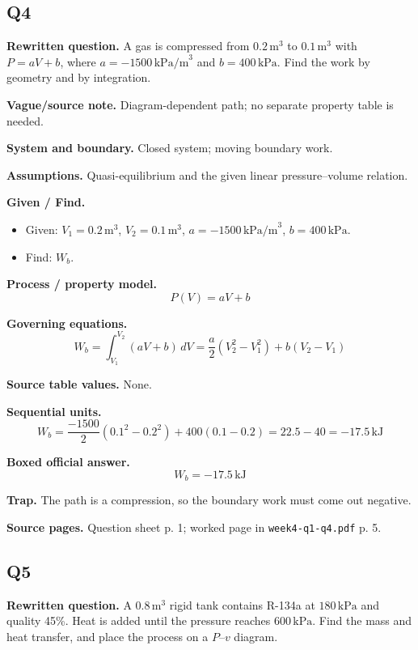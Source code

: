 \subsection*{Q4}
\textbf{Rewritten question.} A gas is compressed from $0.2\,\text{m}^3$ to $0.1\,\text{m}^3$ with $P=aV+b$, where $a=-1500\,\text{kPa/m}^3$ and $b=400\,\text{kPa}$. Find the work by geometry and by integration.

\textbf{Vague/source note.} Diagram-dependent path; no separate property table is needed.

\textbf{System and boundary.} Closed system; moving boundary work.

\textbf{Assumptions.} Quasi-equilibrium and the given linear pressure--volume relation.

\textbf{Given / Find.}
\begin{itemize}
  \item Given: $V_1=0.2\,\text{m}^3$, $V_2=0.1\,\text{m}^3$, $a=-1500\,\text{kPa/m}^3$, $b=400\,\text{kPa}$.
  \item Find: $W_b$.
\end{itemize}

\textbf{Process / property model.}
\[
P(V)=aV+b
\]

\textbf{Governing equations.}
\[
W_b=\int_{V_1}^{V_2}(aV+b)\,dV
=\frac{a}{2}(V_2^2-V_1^2)+b(V_2-V_1)
\]

\textbf{Source table values.} None.

\textbf{Sequential units.}
\[
W_b=\frac{-1500}{2}(0.1^2-0.2^2)+400(0.1-0.2)
=22.5-40=-17.5\,\text{kJ}
\]

\textbf{Boxed official answer.}
\[
\boxed{W_b=-17.5\,\text{kJ}}
\]

\textbf{Trap.} The path is a compression, so the boundary work must come out negative.

\textbf{Source pages.} Question sheet p. 1; worked page in \texttt{week4-q1-q4.pdf} p. 5.


\subsection*{Q5}
\textbf{Rewritten question.} A $0.8\,\text{m}^3$ rigid tank contains R-134a at $180\,\text{kPa}$ and quality 45\%. Heat is added until the pressure reaches $600\,\text{kPa}$. Find the mass and heat transfer, and place the process on a $P$--$v$ diagram.

